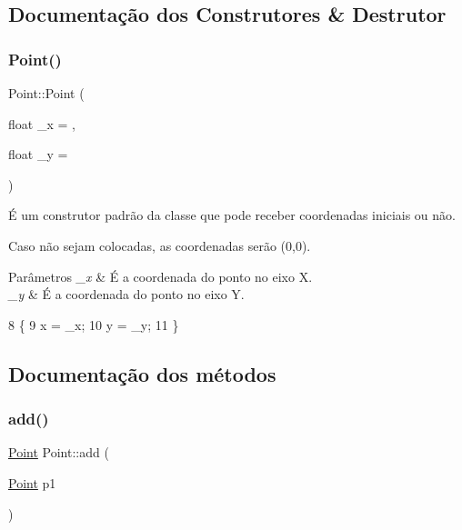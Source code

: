 \subsection{Documentação dos Construtores \& Destrutor}
\mbox{\label{class_point_a06c32166c2ad9eac25799ef189b49683}} 
\subsubsection{\texorpdfstring{Point()}{Point()}}
{\footnotesize\ttfamily Point\+::\+Point (\begin{DoxyParamCaption}\item[{float}]{\+\_\+x = {},  }\item[{float}]{\+\_\+y = {} }\end{DoxyParamCaption})}



É um construtor padrão da classe que pode receber coordenadas iniciais ou não. 

Caso não sejam colocadas, as coordenadas serão (0,0). 
\begin{DoxyParams}{Parâmetros}
{\em \+\_\+x} & É a coordenada do ponto no eixo X. \\
\hline
{\em \+\_\+y} & É a coordenada do ponto no eixo Y. \\
\hline
\end{DoxyParams}

\begin{DoxyCode}
8 \{
9     x = \_x;
10     y = \_y;
11 \}
\end{DoxyCode}


\subsection{Documentação dos métodos}
\mbox{\label{class_point_a9dbea84b07b0a8ec3bbb9e58b3d15899}} 
\subsubsection{\texorpdfstring{add()}{add()}}
{\footnotesize\ttfamily \mbox{\hyperlink{class_point}{Point}} Point\+::add (\begin{DoxyParamCaption}\item[{\mbox{\hyperlink{class_point}{Point}}}]{p1 }\end{DoxyParamCaption})}



